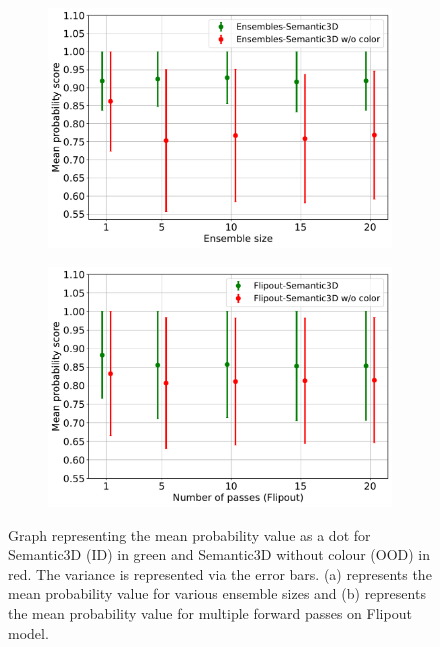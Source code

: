     \begin{figure}[!ht]
        \centering
        \begin{subfigure}{0.98\textwidth}
            \centering
        \includegraphics[scale=0.5]{images/MSP/Ensembles_MSP_semvsemwoc.pdf}
        \caption{}
        \label{fig:msp_ensembles_ood_2}
        \end{subfigure}
        \begin{subfigure}{0.98\textwidth}
            \centering
        \includegraphics[scale=0.5]{images/MSP/Flipout_MSP_semvsemwoc.pdf}
        \caption{}
        \label{fig:msp_flipout_ood_2}
        \end{subfigure}
        \caption{Graph representing the mean probability value as a dot for Semantic3D (ID) in green and Semantic3D without colour (OOD) in red. The variance is represented via the error bars.  (a) represents the mean probability value for various ensemble sizes and (b) represents the mean probability value for multiple forward passes on Flipout model.}
    \end{figure}
